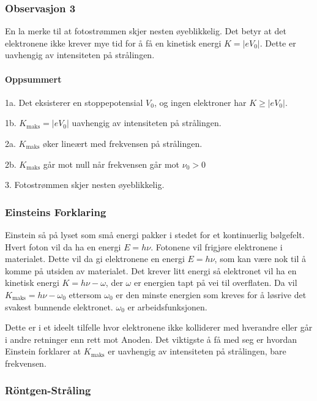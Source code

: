 \subsubsection{Observasjon 3}
En la merke til at fotostrømmen skjer nesten øyeblikkelig. Det betyr at det elektronene ikke krever mye tid for å få en kinetisk energi $K = \left\vert eV_0 \right\vert $. Dette er uavhengig av intensiteten på strålingen.

\paragraph{Oppsummert}

  1a. Det eksisterer en stoppepotensial $V_0$, og ingen elektroner har $K \ge  \left\vert eV_0 \right\vert $. 
  
  1b. $K_{\text{maks}} = \left\vert e V_0 \right\vert $ uavhengig av intensiteten på strålingen.
  
  2a. $K_{\text{maks}}$ øker lineært med frekvensen på strålingen.
  
  2b. $K_{\text{maks}}$ går mot null når frekvensen går mot $ν_0 > 0$
  
  3. Fotostrømmen skjer nesten øyeblikkelig.

\subsubsection{Einsteins Forklaring}
Einstein så på lyset som små energi pakker i stedet for et kontinuerlig bølgefelt. Hvert foton vil da ha en energi $E = hν$. Fotonene vil frigjøre elektronene i materialet. Dette vil da gi elektronene en energi $E = hν$, som kan være nok til å komme på utsiden av materialet. Det krever litt energi så elektronet vil ha en kinetisk energi $K = hν - ω$, der $ω$ er energien tapt på vei til overflaten. Da vil $K_{\text{maks}} = hν - ω_0$ ettersom $ω_0$ er den minste energien som kreves for å løsrive det svakest bunnende elektronet. $ω_0$ er arbeidsfunksjonen. 

Dette er i et ideelt tilfelle hvor elektronene ikke kolliderer med hverandre eller går i andre retninger enn rett mot Anoden. Det viktigste å få med seg er hvordan Einstein forklarer at $K_{\text{maks}}$ er uavhengig av intensiteten på strålingen, bare frekvensen. 


\subsubsection{Röntgen-Stråling}

